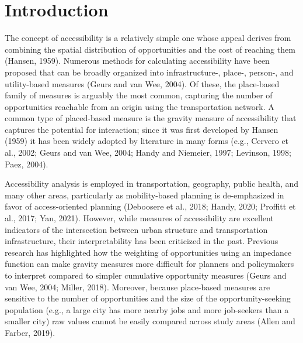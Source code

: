 \documentclass[]{elsarticle} %
\begin{document}
\newpage

\hypertarget{introduction}{%
\section{Introduction}\label{introduction}}

The concept of accessibility is a relatively simple one whose appeal
derives from combining the spatial distribution of opportunities and the
cost of reaching them (Hansen, 1959). Numerous methods for calculating
accessibility have been proposed that can be broadly organized into
infrastructure-, place-, person-, and utility-based measures (Geurs and
van Wee, 2004). Of these, the place-based family of measures is arguably
the most common, capturing the number of opportunities reachable from an
origin using the transportation network. A common type of placed-based
measure is the gravity measure of accessibility that captures the
potential for interaction; since it was first developed by Hansen (1959)
it has been widely adopted by literature in many forms (e.g., Cervero et
al., 2002; Geurs and van Wee, 2004; Handy and Niemeier, 1997; Levinson,
1998; Paez, 2004).

Accessibility analysis is employed in transportation, geography, public
health, and many other areas, particularly as mobility-based planning is
de-emphasized in favor of access-oriented planning (Deboosere et al.,
2018; Handy, 2020; Proffitt et al., 2017; Yan, 2021). However, while
measures of accessibility are excellent indicators of the intersection
between urban structure and transportation infrastructure, their
interpretability has been criticized in the past. Previous research has
highlighted how the weighting of opportunities using an impedance
function can make gravity measures more difficult for planners and
policymakers to interpret compared to simpler cumulative opportunity
measures (Geurs and van Wee, 2004; Miller, 2018). Moreover, because
place-based measures are sensitive to the number of opportunities and
the size of the opportunity-seeking population (e.g., a large city has
more nearby jobs and more job-seekers than a smaller city) raw values
cannot be easily compared across study areas (Allen and Farber, 2019).
\end{document}
